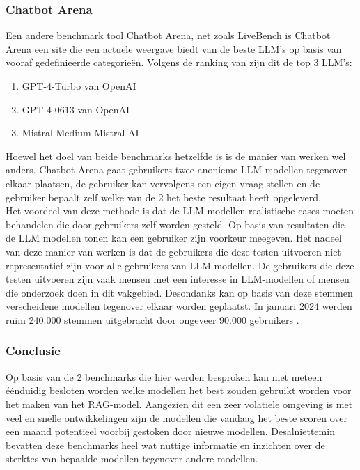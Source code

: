 \subsubsection{Chatbot Arena} 

Een andere benchmark tool Chatbot Arena, net zoals LiveBench is Chatbot Arena een site die een actuele weergave biedt van de beste LLM's op basis van vooraf gedefinieerde categorieën. 
Volgens de ranking van \textcite{chiang2024chatbotarenaopenplatform} zijn dit de top 3 LLM's:

\begin{enumerate}
    \item GPT-4-Turbo van OpenAI
    \item GPT-4-0613 van OpenAI
    \item Mistral-Medium Mistral AI
\end{enumerate}

Hoewel het doel van beide benchmarks hetzelfde is is de manier van werken wel anders. Chatbot Arena gaat gebruikers twee anonieme LLM modellen tegenover elkaar plaatsen, de gebruiker kan vervolgens een eigen vraag stellen en de gebruiker bepaalt zelf welke van de 2 het beste resultaat heeft opgeleverd.
\\[1em]
Het voordeel van deze methode is dat de LLM-modellen realistische cases moeten behandelen die door gebruikers zelf worden gesteld. Op basis van resultaten die de LLM modellen tonen kan een gebruiker zijn voorkeur meegeven. Het nadeel van deze manier van werken is dat de gebruikers die deze testen uitvoeren niet representatief zijn voor alle gebruikers van LLM-modellen. De gebruikers die deze testen uitvoeren zijn vaak mensen met een interesse in LLM-modellen of mensen die onderzoek doen in dit vakgebied. Desondanks kan op basis van deze stemmen verscheidene modellen tegenover elkaar worden geplaatst. In januari 2024 werden ruim 240.000 stemmen uitgebracht door ongeveer 90.000 gebruikers \autocite{chiang2024chatbotarenaopenplatform}. 

\subsubsection{Conclusie}

Op basis van de 2 benchmarks die hier werden besproken kan niet meteen éénduidig besloten worden welke modellen het best zouden gebruikt worden voor het maken van het RAG-model. Aangezien dit een zeer volatiele omgeving is met veel en snelle ontwikkelingen zijn de modellen die vandaag het beste scoren over een maand potentieel voorbij gestoken door nieuwe modellen. Desalniettemin bevatten deze benchmarks heel wat nuttige informatie en inzichten over de sterktes van bepaalde modellen tegenover andere modellen. 


